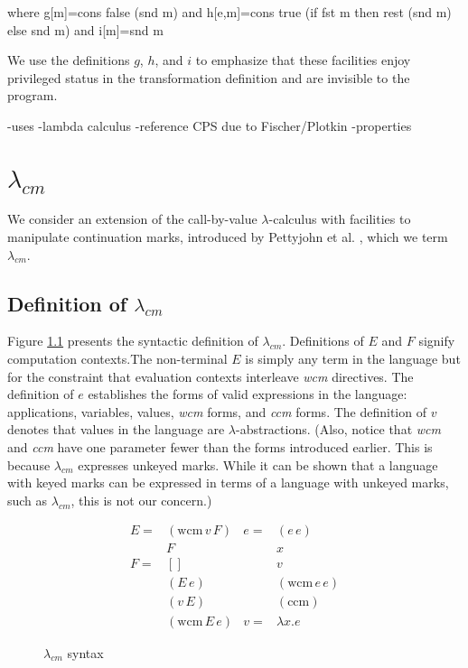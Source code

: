 \documentclass[ms,electronic,twosidetoc,letterpaper,chaptercenter,parttop]{byumsphd}
\begin{document}
where g[m]=cons false (snd m)
and h[e,m]=cons true (if fst m then rest (snd m) else snd m)
and i[m]=snd m

We use the definitions $g$, $h$, and $i$ to emphasize that these facilities enjoy privileged status 
in the transformation definition and are invisible to the program.

-uses
-lambda calculus
-reference CPS due to Fischer/Plotkin
-properties

\chapter{$\lambda_{cm}$}

We consider an extension of the call-by-value $\lambda$-calculus with facilities to
manipulate continuation marks, introduced by Pettyjohn et al.
\cite{pettyjohn2005continuations}, which we term $\lambda_{cm}$.

\section{Definition of $\lambda_{cm}$}

Figure \ref{language-syntax} presents the syntactic definition of $\lambda_{cm}$.
Definitions of $E$ and $F$ signify computation contexts.The non-terminal $E$ is simply any
term in the language but for the constraint that evaluation contexts interleave \emph{wcm}
directives. The definition of $e$ establishes the forms of valid expressions in the
language: applications, variables, values, \emph{wcm} forms, and \emph{ccm} forms. The
definition of $v$ denotes that values in the language are $\lambda$-abstractions. (Also,
notice that \emph{wcm} and \emph{ccm} have one parameter fewer than the forms introduced
earlier. This is because $\lambda_{cm}$ expresses unkeyed marks. While it can be shown
that a language with keyed marks can be expressed in terms of a language with unkeyed
marks, such as $\lambda_{cm}$, this is not our concern.)

\begin{figure}
\begin{align*}
E = &(\mathrm{wcm}\,v\,F) & e = &(e\,e)\\
    &F                    &     &x\\
F = &[]                   &     &v\\
    &(E\,e)               &     &(\mathrm{wcm}\,e\,e)\\
    &(v\,E)               &     &(\mathrm{ccm})\\
    &(\mathrm{wcm}\,E\,e) & v = & \lambda x. e
\end{align*}
\caption{$\lambda_{cm}$ syntax}
\label{language-syntax}
\end{figure}
\end{document}
